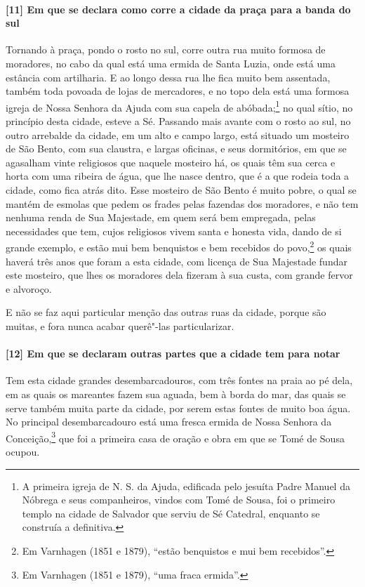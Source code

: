 \begin{linenumbers}
\paragraph{[11] Em que se declara como corre a cidade da praça para a banda do sul} \quad
Tornando à praça, pondo o rosto no sul, corre outra rua muito formosa de moradores, no
cabo da qual está uma ermida de Santa Luzia, onde está uma estância com artilharia. E ao
longo dessa rua lhe fica muito bem assentada, também toda povoada de lojas de mercadores,
e no topo dela está uma formosa igreja de Nossa Senhora da Ajuda com sua capela de
abóbada;\footnote{ A primeira igreja de N. S. da Ajuda, edificada pelo jesuíta Padre
Manuel da Nóbrega e seus companheiros, vindos com Tomé de Sousa, foi o primeiro templo na
cidade de Salvador que serviu de Sé Catedral, enquanto se construía a definitiva.} no qual
sítio, no princípio desta cidade, esteve a Sé. Passando mais avante com o rosto ao sul, no
outro arrebalde da cidade, em um alto e campo largo, está situado um mosteiro de São
Bento, com sua claustra, e largas oficinas, e seus dormitórios, em que se agasalham vinte
religiosos que naquele mosteiro há, os quais têm sua cerca e horta com uma ribeira de
água, que lhe nasce dentro, que é a que rodeia toda a cidade, como fica atrás dito. Esse
mosteiro de São Bento é muito pobre, o qual se mantém de esmolas que pedem os frades pelas
fazendas dos moradores, e não tem nenhuma renda de Sua Majestade, em quem será bem
empregada, pelas necessidades que tem, cujos religiosos vivem santa e honesta vida, dando
de si grande exemplo, e estão mui bem benquistos e bem recebidos do povo,\footnote{ Em
Varnhagen (1851 e 1879), ``estão benquistos e mui bem recebidos''.} os quais haverá três
anos que foram a esta cidade, com licença de Sua Majestade fundar este mosteiro, que lhes
os moradores dela fizeram à sua custa, com grande fervor e alvoroço.

E não se faz aqui particular menção das outras ruas da cidade, porque são muitas, e fora
nunca acabar querê"-las particularizar.

\paragraph{[12] Em que se declaram outras partes que a cidade tem para notar} \quad
Tem esta cidade grandes desembarcadouros, com três fontes na praia ao pé dela, em as quais
os mareantes fazem sua aguada, bem à borda do mar, das quais se serve também muita parte
da cidade, por serem estas fontes de muito boa água. No principal desembarcadouro está uma
fresca ermida de Nossa Senhora da Conceição,\footnote{ Em Varnhagen (1851 e 1879), ``uma
fraca ermida''.} que foi a primeira casa de oração e obra em que se Tomé de Sousa ocupou.


\end{linenumbers}
